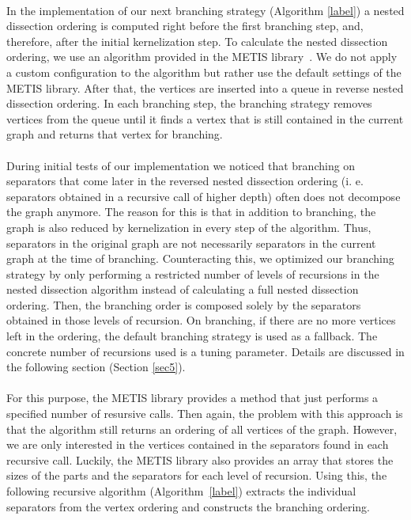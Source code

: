 \documentclass[]{article}
\begin{document}
\paragraph{}
In the implementation of our next branching strategy (Algorithm \ref{label}) a nested dissection ordering is computed right before the first branching step, and, therefore, after the initial kernelization step. To calculate the nested dissection ordering, we use an algorithm provided in the METIS library~\cite{bibid}. We do not apply a custom configuration to the algorithm but rather use the default settings of the METIS library. After that, the vertices are inserted into a queue in reverse nested dissection ordering. In each branching step, the branching strategy removes vertices from the queue until it finds a vertex that is still contained in the current graph and returns that vertex for branching.
\paragraph{} 
During initial tests of our implementation we noticed that branching on separators that come later in the reversed nested dissection ordering (i. e. separators obtained in a recursive call of higher depth) often does not decompose the graph anymore. The reason for this is that in addition to branching, the graph is also reduced by kernelization in every step of the algorithm. Thus, separators in the original graph are not necessarily separators in the current graph at the time of branching. Counteracting this, we optimized our branching strategy by only performing a restricted number of levels of recursions in the nested dissection algorithm instead of calculating a full nested dissection ordering. Then, the branching order is composed solely by the separators obtained in those levels of recursion. On branching, if there are no more vertices left in the ordering, the default branching strategy is used as a fallback. The concrete number of recursions used is a tuning parameter. Details are discussed in the following section (Section \ref{sec5}).
\paragraph{}
For this purpose, the METIS library provides a method that just performs a specified number of resursive calls. Then again, the problem with this approach is that the algorithm still returns an ordering of all vertices of the graph. However, we are only interested in the vertices contained in the separators found in each recursive call. Luckily, the METIS library also provides an array that stores the sizes of the parts and the separators for each level of recursion. Using this, the following recursive algorithm (Algorithm~\ref{label}) extracts the individual separators from the vertex ordering and constructs the branching ordering.
 
\end{document}

